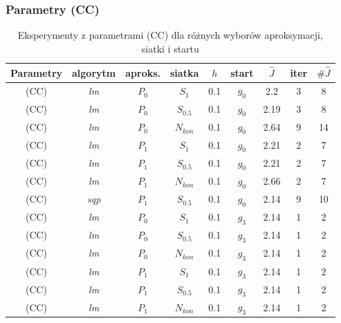 \documentclass[11pt]{article}
\begin{document}
\subsubsection{Parametry (CC)}

\begin{table}[h]
  \begin{center}
    \begin{tabular}{|c|c|c|c|c|c|c|c|c|}
      \hline
      Parametry & algorytm & aproks. & siatka & $h$ & start & $\hat{J}$ & iter & $\#\hat{J}$ \\
      \hline
      (CC) & {\it lm\/} & $P_0$ & $S_1$ & 0.1 & $g_0$ & 2.2 & 3 & 8 \\
      \hline
      (CC) & {\it lm\/} & $P_0$ & $S_{0.5}$ & 0.1 & $g_0$ & 2.19 & 3 & 8 \\
      \hline
      (CC) & {\it lm\/} & $P_0$ & $N_{kon}$ & 0.1 & $g_0$ & 2.64 & 9 & 14 \\
      \hline
      (CC) & {\it lm\/} & $P_1$ & $S_1$ & 0.1 & $g_0$ & 2.21 & 2 & 7 \\
      \hline
      (CC) & {\it lm\/} & $P_1$ & $S_{0.5}$ & 0.1 & $g_0$ & 2.21 & 2 & 7 \\
      \hline
      (CC) & {\it lm\/} & $P_1$ & $N_{kon}$ & 0.1 & $g_0$ & 2.66 & 2 & 7 \\
      \hline
      (CC) & {\it sqp\/} & $P_1$ & $S_{0.5}$ & 0.1 & $g_0$ & 2.14 & 9 & 10 \\
      \hline
      (CC) & {\it lm\/} & $P_0$ & $S_1$ & 0.1 & $g_3$ & 2.14 & 1 & 2 \\
      \hline
      (CC) & {\it lm\/} & $P_0$ & $S_{0.5}$ & 0.1 & $g_3$ & 2.14 & 1 & 2 \\
      \hline
      (CC) & {\it lm\/} & $P_0$ & $N_{kon}$ & 0.1 & $g_3$ & 2.14 & 1 & 2 \\
      \hline
      (CC) & {\it lm\/} & $P_1$ & $S_1$ & 0.1 & $g_3$ & 2.14 & 1 & 2 \\
      \hline
      (CC) & {\it lm\/} & $P_1$ & $S_{0.5}$ & 0.1 & $g_3$ & 2.14 & 1 & 2 \\
      \hline
      (CC) & {\it lm\/} & $P_1$ & $N_{kon}$ & 0.1 & $g_3$ & 2.14 & 1 & 2 \\
      \hline
    \end{tabular}
    \caption{Eksperymenty z parametrami (CC) dla różnych wyborów aproksymacji, siatki i startu}\label{param1_tbl}
  \end{center}
\end{table}
\end{document}

